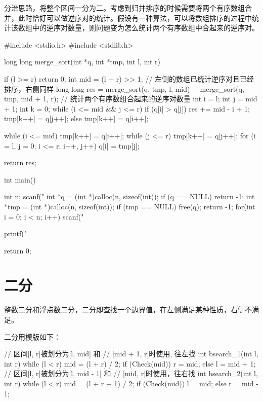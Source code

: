 分治思路，将整个区间一分为二。考虑到归并排序的时候需要将两个有序数组合并，此时恰好可以做逆序对的统计。假设有一种算法，可以将数组排序的过程中统计该数组中的逆序对数量，则问题变为怎么统计两个有序数组中合起来的逆序对。

\begin{mycpptwocol}[归并排序计算逆序对数量]
    #include <stdio.h>
    #include <stdlib.h>

    long long merge_sort(int *q, int *tmp,
    int l, int r) {
        if (l >= r) {
            return 0;
        }
        int mid = (l + r) >> 1;
        // 左侧的数组已统计逆序对且已经排序，右侧同样
        long long res = merge_sort(q, tmp, l, mid) + merge_sort(q, tmp, mid + 1, r);
        // 统计两个有序数组合起来的逆序对数量
        int i = l;
        int j = mid + 1;
        int k = 0;
        while (i <= mid && j <= r) {
            if (q[i] > q[j]) {
                res += mid - i + 1;
                tmp[k++] = q[j++];
            } else {
                tmp[k++] = q[i++];
            }
        }

        while (i <= mid) {
            tmp[k++] = q[i++];
        }
        while (j <= r) {
            tmp[k++] = q[j++];
        }
        for (i = l, j = 0; i <= r;
        i++, j++) {
            q[i] = tmp[j];
        }

        return res;
    }

    int main() {
        int n;
        scanf("%
        int *q = (int *)calloc(n, sizeof(int));
        if (q == NULL) {
            return -1;
        }
        int *tmp = (int *)calloc(n, sizeof(int));
        if (tmp == NULL) {
            free(q);
            return -1;
        }
        for(int i = 0; i < n; i++) {
            scanf("%
        }

        printf("%

        return 0;
    }
\end{mycpptwocol}


\section{二分}
整数二分和浮点数二分，二分即查找一个边界值，在左侧满足某种性质，右侧不满足。

二分用模版如下：
\begin{mycpptwocol}[二分模版]
    // 区间[l, r]被划分为[l, mid] 和
    // [mid + 1, r]时使用, 往左找
    int bsearch_1(int l, int r) {
        while (l < r) {
            mid = (l + r) / 2;
            if (Check(mid)) {
                r = mid;
            } else {
                l = mid + 1;
            }
        }
    }
    // 区间[l, r]被划分为[l, mid - 1] 和
    // [mid, r]时使用，往右找
    int bsearch_2(int l, int r) {
        while (l < r) {
            mid = (l + r + 1) / 2;
            if (Check(mid)) {
                l = mid;
            } else {
                r = mid - 1;
            }
        }
    }
\end{mycpptwocol}


